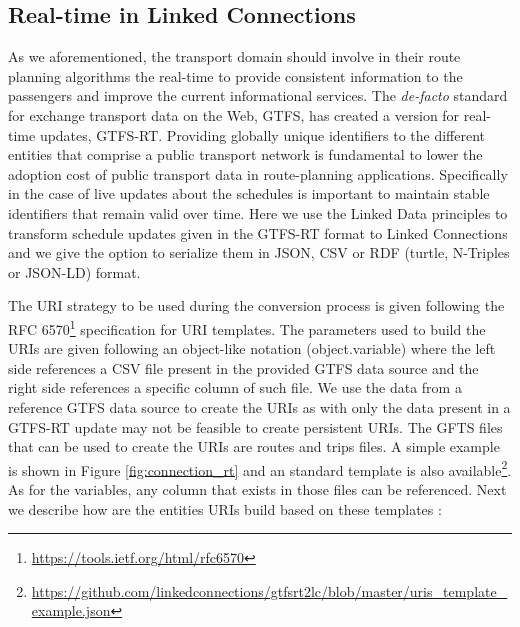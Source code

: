 \documentclass[sw]{iosart2x}
\begin{document}
\subsection{Real-time in Linked Connections}
As we aforementioned, the transport domain should involve in their route planning algorithms the real-time to provide consistent information to the passengers and improve the current  informational services.  The \textit{de-facto} standard for exchange transport data on the Web, GTFS, has created a version for real-time updates, GTFS-RT.  
Providing globally unique identifiers to the different entities that comprise a public transport network is fundamental to lower the adoption cost of public transport data in route-planning applications. Specifically in the case of live updates about the schedules is important to maintain stable identifiers that remain valid over time. Here we use the Linked Data principles to transform schedule updates given in the GTFS-RT format to Linked Connections and we give the option to serialize them in JSON, CSV or RDF (turtle, N-Triples or JSON-LD) format.

The URI strategy to be used during the conversion process is given following the RFC 6570\footnote{\url{https://tools.ietf.org/html/rfc6570}} specification for URI templates. The parameters used to build the URIs are given following an object-like notation (object.variable) where the left side references a CSV file present in the provided GTFS data source and the right side references a specific column of such file. We use the data from a reference GTFS data source to create the URIs as with only the data present in a GTFS-RT update may not be feasible to create persistent URIs. The GFTS files that can be used to create the URIs are routes and trips files. A simple example is shown in Figure \ref{fig:connection_rt} and an standard template is also available\footnote{\url{https://github.com/linkedconnections/gtfsrt2lc/blob/master/uris_template_example.json}}. As for the variables, any column that exists in those files can be referenced. Next we describe how are the entities URIs build based on these templates :
\end{document}
